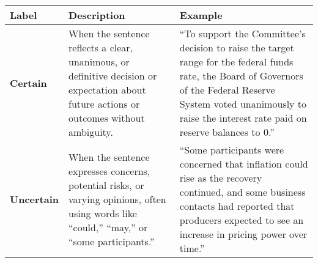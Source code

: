 \begin{table*}
    \caption{}
    \vspace{1em}
    \begin{tabular}{p{}p{}p{}}
    \toprule
    \textbf{Label} & \textbf{Description} & \textbf{Example}\\
    \midrule
    \textbf{Certain} & When the sentence reflects a clear, unanimous, or definitive
    decision or expectation about future actions or outcomes without ambiguity. & “To support the Committee’s decision to raise the target range for the federal funds rate, the Board of Governors of the Federal Reserve System voted unanimously to raise the interest rate paid on reserve balances to 0.” \\
    \midrule
    \textbf{Uncertain} & When the sentence expresses concerns, potential risks, or
    varying opinions, often using words like ``could,'' ``may,'' or ``some participants.'' & “Some participants were concerned that inflation could rise as the recovery continued, and some business contacts had reported that producers expected to see an increase in pricing power over time.” \\
    \bottomrule
    \end{tabular}
    \label{tb:snb_certainty_guide}
    \end{table*}
    